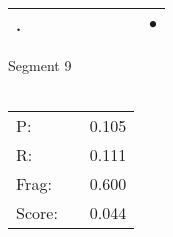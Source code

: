 \documentclass[landscape]{article}
\newcommand{\ssp}{\hspace{2pt}}
\newcommand{\mex}{\cellcolor{g}$\bullet$}
\begin{document}
\begin{tabular}{|l|p{10pt}|p{10pt}|p{10pt}|p{10pt}|p{10pt}|p{10pt}|p{10pt}|p{10pt}|}
\hline
\ssp \cellcolor{ref7}. \ssp&\hspace{2pt}&\hspace{2pt}&\hspace{2pt}&\hspace{2pt}&\hspace{2pt}&\hspace{2pt}&\hspace{2pt}&\hspace{2pt}\mex\\
\hline
\end{tabular}

\vspace{6pt}
\noindent Segment 9\\\\
\noindent\begin{tabular}{lm{12pt}r}
\hline
P:&&0.105\\
R:&&0.111\\
Frag:&&0.600\\
Score:&&0.044\\
\end{tabular}

\newpage
\end{document}
